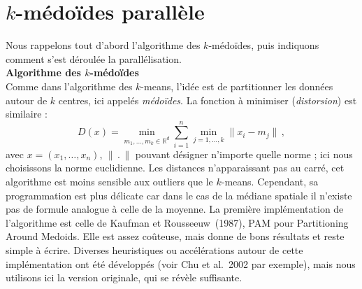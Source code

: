 \documentclass[12pt]{article}
\begin{document}
\section{$k$-médoïdes parallèle}

Nous rappelons tout d'abord l'algorithme des $k$-médoïdes, puis indiquons comment s'est déroulée la parallélisation.\\

\noindent \textbf{Algorithme des $k$-médoïdes}\\
Comme dans l'algorithme des $k$-means, l'idée est de partitionner les données autour de $k$ centres, ici appelés \emph{médoïdes}. 
La fonction à minimiser (\emph{distorsion}) est similaire :
$$D(x) = \min_{m_1,\dots,m_k \in \mathbb{R}^d} \sum_{i=1}^{n} \min_{j=1,\dots,k} \| x_i - m_j \| \, ,$$
avec $x = (x_1,\dots,x_n)$, $\|\,.\,\|$ pouvant désigner n'importe quelle norme ; ici nous choisissons la norme euclidienne. 
Les distances n'apparaissant pas au carré, cet algorithme est moins sensible aux outliers que le $k$-means. 
Cependant, sa programmation est plus délicate car dans le cas de la médiane spatiale il n'existe pas de formule analogue à celle de la moyenne. 
La première implémentation de l'algorithme est celle de Kaufman et Rousseeuw~(1987), PAM pour Partitioning Around Medoids. 
Elle est assez coûteuse, mais donne de bons résultats et reste simple à écrire. Diverses heuristiques ou accélérations autour de cette implémentation 
ont été développés (voir Chu et al.~2002 par exemple), mais nous utilisons ici la version originale, qui se révèle suffisante.\\
\end{document}
